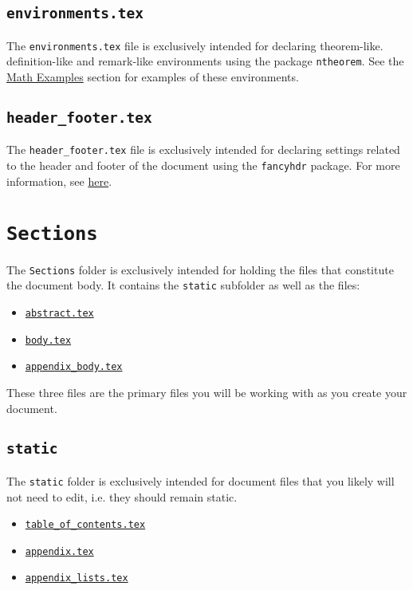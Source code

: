 \subsection{\texttt{environments.tex}}
\label{sec:environments.tex}

The \texttt{environments.tex} file is exclusively intended for declaring theorem-like. definition-like and remark-like environments using the package \texttt{ntheorem}. See the \hyperref[sec:math_examples]{Math Examples} section for examples of these environments.

\subsection{\texttt{header\_footer.tex}}
\label{sec:header_footer.tex}

The \texttt{header\_footer.tex} file is exclusively intended for declaring settings related to the header and footer of the document using the \texttt{fancyhdr} package. For more information, see \href{https://en.wikibooks.org/wiki/LaTeX/Customizing_Page_Headers_and_Footers}{here}.

\section{\texttt{Sections}}
\label{sec:sections}

The \texttt{Sections} folder is exclusively intended for holding the files that constitute the document body. It contains the \texttt{static} subfolder as well as the files:
\begin{itemize}
    \item \hyperref[sec:abstract.tex]{\texttt{abstract.tex}}
    \item \hyperref[sec:body.tex]{\texttt{body.tex}}
    \item \hyperref[sec:appendix_body.tex]{\texttt{appendix\_body.tex}}
\end{itemize}
These three files are the primary files you will be working with as you create your document.

\subsection{\texttt{static}}
\label{sec:static}

The \texttt{static} folder is exclusively intended for document files that you likely will not need to edit, i.e. they should remain static.
\begin{itemize}
    \item \hyperref[sec:table_of_contents.tex]{\texttt{table\_of\_contents.tex}}
    \item \hyperref[sec:appendix.tex]{\texttt{appendix.tex}}
    \item \hyperref[sec:appendix_lists.tex]{\texttt{appendix\_lists.tex}}
\end{itemize}

